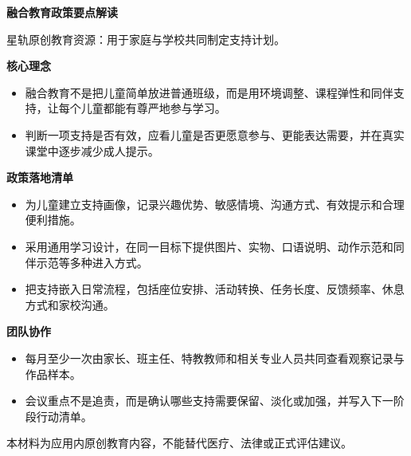 \documentclass[11pt]{article}
\begin{document}
{\color[HTML]{1F5FD2}\LARGE\bfseries 融合教育政策要点解读\par}
{\color[HTML]{667085}\small 星轨原创教育资源：用于家庭与学校共同制定支持计划。\par}
\vspace{0.8em}
{\color[HTML]{111827}\large\bfseries 核心理念\par}
\begin{itemize}
\item 融合教育不是把儿童简单放进普通班级，而是用环境调整、课程弹性和同伴支持，让每个儿童都能有尊严地参与学习。
\item 判断一项支持是否有效，应看儿童是否更愿意参与、更能表达需要，并在真实课堂中逐步减少成人提示。
\end{itemize}
{\color[HTML]{111827}\large\bfseries 政策落地清单\par}
\begin{itemize}
\item 为儿童建立支持画像，记录兴趣优势、敏感情境、沟通方式、有效提示和合理便利措施。
\item 采用通用学习设计，在同一目标下提供图片、实物、口语说明、动作示范和同伴示范等多种进入方式。
\item 把支持嵌入日常流程，包括座位安排、活动转换、任务长度、反馈频率、休息方式和家校沟通。
\end{itemize}
{\color[HTML]{111827}\large\bfseries 团队协作\par}
\begin{itemize}
\item 每月至少一次由家长、班主任、特教教师和相关专业人员共同查看观察记录与作品样本。
\item 会议重点不是追责，而是确认哪些支持需要保留、淡化或加强，并写入下一阶段行动清单。
\end{itemize}
\vfill
{\color[HTML]{667085}\footnotesize 本材料为应用内原创教育内容，不能替代医疗、法律或正式评估建议。\par}
\end{document}
